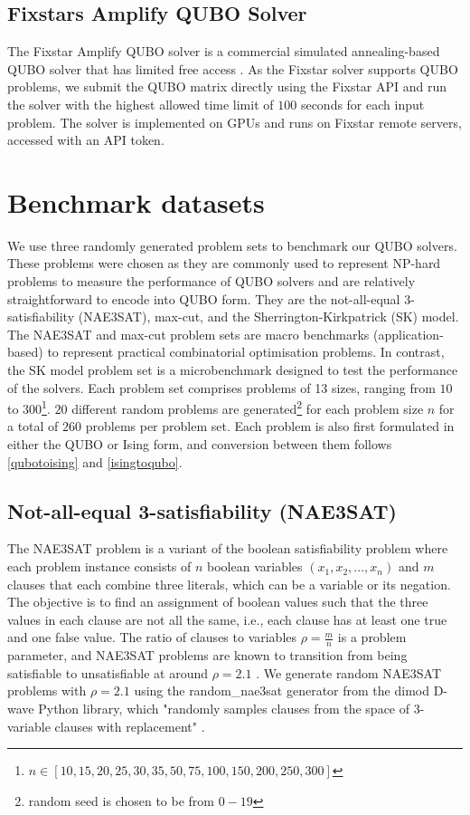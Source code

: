 
\subsection{Fixstars Amplify QUBO Solver}
The Fixstar Amplify QUBO solver is a commercial simulated annealing-based QUBO solver that has limited free access \cite{b12}. As the Fixstar solver supports QUBO problems, we submit the QUBO matrix directly using the Fixstar API and run the solver with the highest allowed time limit of $100$ seconds for each input problem. The solver is implemented on GPUs and runs on Fixstar remote servers, accessed with an API token.

\section{Benchmark datasets}
We use three randomly generated problem sets to benchmark our QUBO solvers. These problems were chosen as they are commonly used to represent NP-hard problems to measure the performance of QUBO solvers and are relatively straightforward to encode into QUBO form. They are the not-all-equal 3-satisfiability (NAE3SAT), max-cut, and the Sherrington-Kirkpatrick (SK) model. The NAE3SAT and max-cut problem sets are macro benchmarks (application-based) to represent practical combinatorial optimisation problems. In contrast, the SK model problem set is a microbenchmark designed to test the performance of the solvers. Each problem set comprises problems of 13 sizes, ranging from $10$ to $300$\footnote{$n \in [10,15,20,25,30,35,50,75,100,150,200,250,300]$}. $20$ different random problems are generated\footnote{random seed is chosen to be from $0-19$} for each problem size $n$ for a total of $260$ problems per problem set. Each problem is also first formulated in either the QUBO or Ising form, and conversion between them follows \autoref{qubotoising} and \autoref{isingtoqubo}.

\subsection*{Not-all-equal 3-satisfiability (NAE3SAT)}
The NAE3SAT problem is a variant of the boolean satisfiability problem where each problem instance consists of $n$ boolean variables $(x_1, x_2, ..., x_n)$ and $m$ clauses that each combine three literals, which can be a variable or its negation. The objective is to find an assignment of boolean values such that the three values in each clause are not all the same, i.e., each clause has at least one true and one false value. The ratio of clauses to variables $\rho = \frac{m}{n}$ is a problem parameter, and NAE3SAT problems are known to transition from being satisfiable to unsatisfiable at around $\rho = 2.1$ \cite{nae3sattransition}. We generate random NAE3SAT problems with $\rho = 2.1$ using the random\_nae3sat generator from the dimod D-wave Python library, which "randomly samples clauses from the space of 3-variable clauses with replacement" \cite{dimodrandomnae3sat}. 

